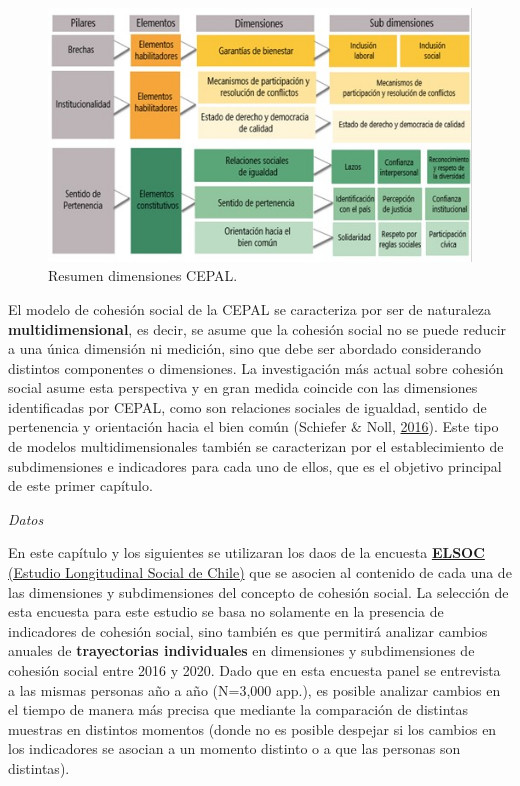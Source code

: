 \documentclass[
  12pt,
]{book}
\begin{document}
\begin{figure}[H]

{\centering \includegraphics[width=1\linewidth,height=1\textheight]{images/dimensiones-cepal} 

}

\caption{Resumen dimensiones CEPAL.}\label{fig:esquema-cepal}
\end{figure}

El modelo de cohesión social de la CEPAL se caracteriza por ser de naturaleza \textbf{multidimensional}, es decir, se asume que la cohesión social no se puede reducir a una única dimensión ni medición, sino que debe ser abordado considerando distintos componentes o dimensiones. La investigación más actual sobre cohesión social asume esta perspectiva y en gran medida coincide con las dimensiones identificadas por CEPAL, como son relaciones sociales de igualdad, sentido de pertenencia y orientación hacia el bien común (Schiefer \& Noll, \protect\hyperlink{ref-schiefer_essentials_2016}{2016}). Este tipo de modelos multidimensionales también se caracterizan por el establecimiento de subdimensiones e indicadores para cada uno de ellos, que es el objetivo principal de este primer capítulo.

\emph{Datos}

En este capítulo y los siguientes se utilizaran los daos de la encuesta \href{https://coes.cl/encuesta-panel/}{\textbf{ELSOC} (Estudio Longitudinal Social de Chile)} que se asocien al contenido de cada una de las dimensiones y subdimensiones del concepto de cohesión social. La selección de esta encuesta para este estudio se basa no solamente en la presencia de indicadores de cohesión social, sino también es que permitirá analizar cambios anuales de \textbf{trayectorias individuales} en dimensiones y subdimensiones de cohesión social entre 2016 y 2020. Dado que en esta encuesta panel se entrevista a las mismas personas año a año (N=3,000 app.), es posible analizar cambios en el tiempo de manera más precisa que mediante la comparación de distintas muestras en distintos momentos (donde no es posible despejar si los cambios en los indicadores se asocian a un momento distinto o a que las personas son distintas).
\end{document}
